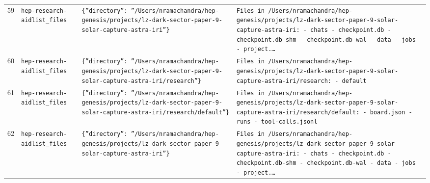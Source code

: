 \documentclass[11pt,a4paper]{article}
\begin{document}
\begin{longtable}{@{}p{}p{}p{}p{}@{}}
59 & \texttt{hep-research-aid}\newline\texttt{list\_\allowbreak{}files} & \texttt{\{''directory'':\allowbreak{} ''/\allowbreak{}Users/\allowbreak{}nramachandra/\allowbreak{}hep-genesis/\allowbreak{}projects/\allowbreak{}lz-dark-sector-paper-9-solar-capture-astra-iri''\}\allowbreak{}} & \texttt{Files in /\allowbreak{}Users/\allowbreak{}nramachandra/\allowbreak{}hep-genesis/\allowbreak{}projects/\allowbreak{}lz-dark-sector-paper-9-solar-capture-astra-iri:\allowbreak{}   - chats   - checkpoint.db   - checkpoint.db-shm   - checkpoint.db-wal   - data   - jobs   - project.\ldots{}\allowbreak{}} \\
60 & \texttt{hep-research-aid}\newline\texttt{list\_\allowbreak{}files} & \texttt{\{''directory'':\allowbreak{} ''/\allowbreak{}Users/\allowbreak{}nramachandra/\allowbreak{}hep-genesis/\allowbreak{}projects/\allowbreak{}lz-dark-sector-paper-9-solar-capture-astra-iri/\allowbreak{}research''\}\allowbreak{}} & \texttt{Files in /\allowbreak{}Users/\allowbreak{}nramachandra/\allowbreak{}hep-genesis/\allowbreak{}projects/\allowbreak{}lz-dark-sector-paper-9-solar-capture-astra-iri/\allowbreak{}research:\allowbreak{}   - default} \\
61 & \texttt{hep-research-aid}\newline\texttt{list\_\allowbreak{}files} & \texttt{\{''directory'':\allowbreak{} ''/\allowbreak{}Users/\allowbreak{}nramachandra/\allowbreak{}hep-genesis/\allowbreak{}projects/\allowbreak{}lz-dark-sector-paper-9-solar-capture-astra-iri/\allowbreak{}research/\allowbreak{}default''\}\allowbreak{}} & \texttt{Files in /\allowbreak{}Users/\allowbreak{}nramachandra/\allowbreak{}hep-genesis/\allowbreak{}projects/\allowbreak{}lz-dark-sector-paper-9-solar-capture-astra-iri/\allowbreak{}research/\allowbreak{}default:\allowbreak{}   - board.json   - runs   - tool-calls.jsonl} \\
62 & \texttt{hep-research-aid}\newline\texttt{list\_\allowbreak{}files} & \texttt{\{''directory'':\allowbreak{} ''/\allowbreak{}Users/\allowbreak{}nramachandra/\allowbreak{}hep-genesis/\allowbreak{}projects/\allowbreak{}lz-dark-sector-paper-9-solar-capture-astra-iri''\}\allowbreak{}} & \texttt{Files in /\allowbreak{}Users/\allowbreak{}nramachandra/\allowbreak{}hep-genesis/\allowbreak{}projects/\allowbreak{}lz-dark-sector-paper-9-solar-capture-astra-iri:\allowbreak{}   - chats   - checkpoint.db   - checkpoint.db-shm   - checkpoint.db-wal   - data   - jobs   - project.\ldots{}\allowbreak{}} \\

\end{longtable}
\end{document}
